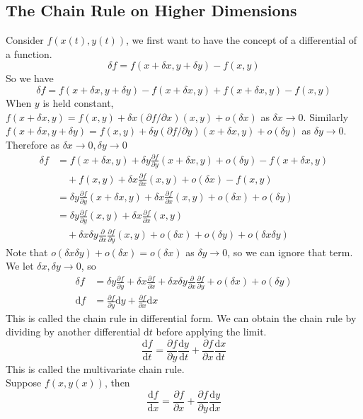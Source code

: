 \subsection{The Chain Rule on Higher Dimensions}
Consider $f(x(t),y(t))$, we first want to have the concept of a differential of a function.
$$\delta f=f(x+\delta x, y+\delta y)-f(x,y)$$
So we have
$$\delta f=f(x+\delta x, y+\delta y)-f(x+\delta x,y)+f(x+\delta x,y)-f(x,y)$$
When $y$ is held constant, $f(x+\delta x,y)=f(x,y)+\delta x(\partial f/\partial x)(x,y)+o(\delta x)$ as $\delta x\to0$.
Similarly $f(x+\delta x,y+\delta y)=f(x,y)+\delta y(\partial f/\partial y)(x+\delta x,y)+o(\delta y)$ as $\delta y\to0$.
Therefore as $\delta x\to 0,\delta y\to0$
\begin{align*}
    \delta f
    &=f(x+\delta x,y)+\delta y\frac{\partial f}{\partial y}(x+\delta x,y)+o(\delta y)-f(x+\delta x,y)\\
    &\quad+f(x,y)+\delta x\frac{\partial f}{\partial x}(x,y)+o(\delta x)-f(x,y)\\
    &=\delta y\frac{\partial f}{\partial y}(x+\delta x,y)+\delta x\frac{\partial f}{\partial x}(x,y)+o(\delta x)+o(\delta y)\\
    &=\delta y\frac{\partial f}{\partial y}(x,y)+\delta x\frac{\partial f}{\partial x}(x,y)\\
    &\quad+\delta x\delta y\frac{\partial}{\partial x}\frac{\partial f}{\partial y}(x,y)+o(\delta x)+o(\delta y)+o(\delta x\delta y)
\end{align*}
Note that $o(\delta x\delta y)+o(\delta x)=o(\delta x)$ as $\delta y\to0$, so we can ignore that term.\\
We let $\delta x,\delta y\to 0$, so
\begin{align*}
    \delta f&=\delta y\frac{\partial f}{\partial y}+\delta x\frac{\partial f}{\partial x}+\delta x\delta y\frac{\partial}{\partial x}\frac{\partial f}{\partial y}+o(\delta x)+o(\delta y)\\
    \mathrm df&=\frac{\partial f}{\partial y}\mathrm dy+\frac{\partial f}{\partial x}\mathrm dx
\end{align*}
This is called the chain rule in differential form.
We can obtain the chain rule by dividing by another differential $\mathrm dt$ before applying the limit.
$$\frac{\mathrm df}{\mathrm dt}=\frac{\partial f}{\partial y}\frac{\mathrm dy}{\mathrm dt}+\frac{\partial f}{\partial x}\frac{\mathrm dx}{\mathrm dt}$$
This is called the multivariate chain rule.\\
Suppose $f(x,y(x))$, then
$$\frac{\mathrm df}{\mathrm dx}=\frac{\partial f}{\partial x}+\frac{\partial f}{\partial y}\frac{\mathrm dy}{\mathrm dx}$$
